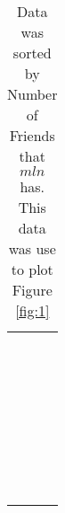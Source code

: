 \begin{table}[!htbp]
\begin{center}
\begin{minipage}{0.22\textwidth}
\begin{tabular}{|l | l|}
			 & \\
			 & \\
			 & \\
			 & \\
			 & \\
			 & \\
			 & \\
			 & \\
			 & \\
			 & \\
			 & \\
			 & \\
			 & \\
			 & \\
			 & \\
			 & \\
			 & \\
			 & \\
			 & \\
			 & \\
			 & \\
			 & \\
			 & \\
			 & \\
			 & \\
			 & \\
			 & \\
			 & \\
			 & \\
			 & \\
			 & \\
			 & \\	
			\hline
		\end{tabular}
	\end{minipage}	
	\caption*{\scriptsize Data was sorted by Number of Friends that $mln$ has. This data was use to plot Figure \ref{fig:1}}
	 \end{center}
\end{table}

